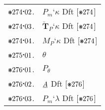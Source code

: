 \documentclass[12pt,openany,leqno,twocolumn]{book}
\newcommand{\pmast}{\text{\resizebox{!}{.75\height}{\ding{107}}}} %
\newcommand{\pmcdot}{\text{\raisebox{.05cm}{$\boldsymbol\cdot$}}} %
\newcommand{\pmbreve}[1]{\mathbf{\breve{\text{$#1$}}}}
\newcommand{\pma}{\emph{A}} %
\newcommand{\pmsfclsm}[2]{#1_m\textbf{`}#2} %
\newcommand{\pmsfclsp}[2]{\pmbreve{#1}_P\textbf{`}{#2}} %
\newcommand{\pmsfclsmp}[1]{M_P\textbf{`}{#1}} %
\newcommand{\pmcser}{\theta} %
\newcommand{\pmcsercl}[1]{#1_\pmcser} %
\begin{document}
\begin{tabular}{l l}
	$\pmast274\pmcdot02$. & $\pmsfclsm{P}{\kappa}$ \hspace{3.4ex} Dft [\(\pmast274\)] \\
	$\pmast274\pmcdot03$. & $\pmsfclsp{T}{\kappa}$ \hspace{3.7ex} Dft [\(\pmast274\)] \\
	$\pmast274\pmcdot04$. & $\pmsfclsmp{\kappa}$ \hspace{3ex} Dft [\(\pmast274\)] \\
	$\pmast275\pmcdot01$. & $\pmcser$ \\
	$\pmast276\pmcdot01$. & $\pmcsercl{P}$ \\
	$\pmast276\pmcdot02$. & $\pma$ \hspace{7.3ex} Dft [\(\pmast276\)] \\
	$\pmast276\pmcdot03$. & $\pmsfclsm{P}{\lambda}$ \hspace{4ex} Dft [\(\pmast276\)] 
\end{tabular}
\end{document}
